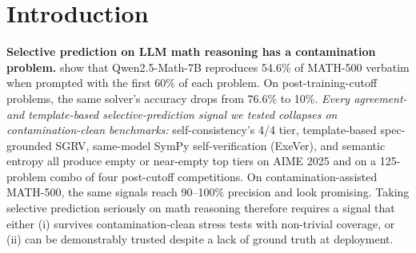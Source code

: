 \documentclass{article}
\begin{document}
\begin{abstract}
39.4\% coverage, confirming the mechanism is lab-agnostic and consistent with our theoretical convergence analysis.

\textbf{Contributions.} (C1) We measure correlated-error collapse on code-executed self-verification and isolate independence-from-the-solver --- not randomization --- as the operative mitigating factor via an empirically measured $2\times 2$ ablation. (C2) We propose X-SGRV, a cross-family symbolic verifier that achieves high top-tier precision on contamination-assisted MATH-500 and is the first selective-prediction signal in this line of work with non-zero precision-preserving coverage on contamination-clean AIME 2025 and CleanMath. (C3) We propose a gold-free deployment-time adversarial filter that detects broken verifiers without ground-truth labels, selected on a held-out dev split. \textbf{Honest operating point:} X-SGRV's precision-preserving coverage on contamination-clean benchmarks is single-digit (3.2--6.7\%); we position X-SGRV as a high-precision abstention filter, not a replacement for continuous-score selective prediction. All experiments use public benchmarks and public API models; code, prompts, probe sets, and raw results are released.
\end{abstract}

\section{Introduction}

\textbf{Selective prediction on LLM math reasoning has a contamination problem.} \citet{wu2025contam} show that Qwen2.5-Math-7B reproduces 54.6\% of MATH-500 verbatim when prompted with the first 60\% of each problem. On post-training-cutoff problems, the same solver's accuracy drops from 76.6\% to 10\%. \emph{Every agreement- and template-based selective-prediction signal we tested collapses on contamination-clean benchmarks:} self-consistency's 4/4 tier, template-based spec-grounded SGRV, same-model SymPy self-verification (ExeVer), and semantic entropy all produce empty or near-empty top tiers on AIME 2025 and on a 125-problem combo of four post-cutoff competitions. On contamination-assisted MATH-500, the same signals reach 90--100\% precision and look promising. Taking selective prediction seriously on math reasoning therefore requires a signal that either (i) survives contamination-clean stress tests with non-trivial coverage, or (ii) can be demonstrably trusted despite a lack of ground truth at deployment.
\end{document}
